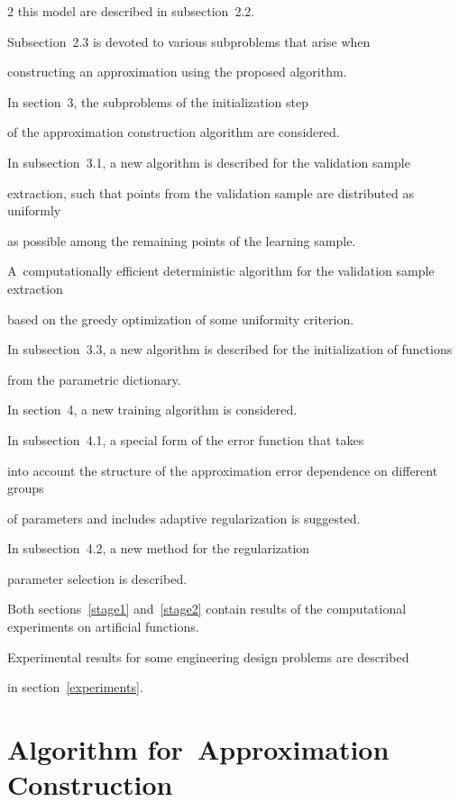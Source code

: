 \begin{multicols}{2}
  this model are described in subsection~2.2.

Subsection~2.3 is devoted to various subproblems that arise when 

constructing an approximation using the proposed algorithm.

In section~3, the subproblems of the initialization step

 of the approximation construction algorithm are considered. 

In subsection~3.1, a new algorithm is described for the validation sample 

extraction, such that points from the validation sample are distributed as uniformly

 as possible among the remaining points of the learning sample. 

 A~computationally efficient deterministic algorithm for the validation sample extraction 

 based on the greedy optimization of some uniformity criterion.

In subsection~3.3, a new algorithm is described for the initialization of functions 

from the parametric dictionary. 

In section~4, a new training algorithm is considered. 

In subsection~4.1, a special form of the error function that takes 

into account the structure of the approximation error dependence on different groups 

of parameters and includes adaptive regularization is suggested.

In subsection~4.2, a new method for the regularization 

parameter selection is described.

Both sections~\ref{stage1} and~\ref{stage2} contain results of the computational experiments on artificial functions.

Experimental results for some engineering design problems are described 

in section~\ref{experiments}.

{



}



\section{Algorithm for~Approximation Construction}




\end{multicols}
